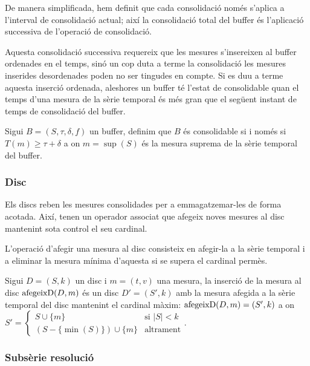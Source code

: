 De manera simplificada, hem definit que cada consolidació només
s'aplica a l'interval de consolidació actual; així la consolidació
total del buffer és l'aplicació successiva de l'operació de
consolidació.

Aquesta consolidació successiva requereix que les mesures s'insereixen
al buffer ordenades en el temps, sinó un cop duta a terme la
consolidació les mesures inserides desordenades poden no ser tingudes
en compte. Si es duu a terme aquesta inserció ordenada, aleshores un
buffer té l'estat de consolidable quan el temps d'una mesura de la
sèrie temporal és més gran que el següent instant de temps de
consolidació del buffer.
\begin{definition}\label{def:model:buffer_consolidable}
  Sigui $B=(S,\tau,\delta,f)$ un buffer, definim que $B$ és
  consolidable si i només si $T(m) \geq \tau+\delta$ a on $m=\sup(S)$
  és la mesura suprema de la sèrie temporal del buffer.
\end{definition}



\subsubsection{Disc}

Els discs reben les mesures consolidades per a emmagatzemar-les de
forma acotada. Així, tenen un operador associat que afegeix noves
mesures al disc mantenint sota control el seu cardinal.


L'operació d'afegir una mesura al disc consisteix en afegir-la a la
sèrie temporal i a eliminar la mesura mínima d'aquesta si se supera el
cardinal permès.
\begin{definition}
  Sigui $D=(S,k)$ un disc i $m=(t,v)$ una mesura, la inserció de la
  mesura al disc $\operatorname*{afegeixD}(D,m)$ és un disc $D'=(S',k)$ amb la mesura
  afegida a la sèrie temporal del disc mantenint el cardinal màxim:
  $\operatorname*{afegeixD}(D,m) = (S',k)$ a on $S'=
  \begin{cases}
      S\cup\{m\} &\text{si }  |S|<k\\
      (S-\{\min(S)\}) \cup \{m\} &\text{altrament}
    \end{cases}$.
\end{definition}




\subsubsection{Subsèrie resolució}

